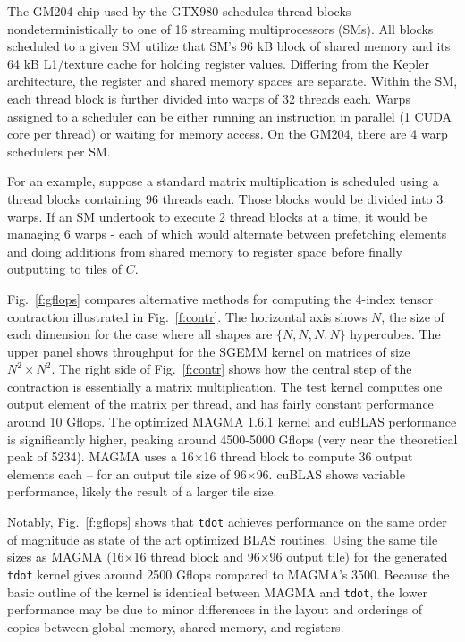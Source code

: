 \documentclass{sigplanconf}
\begin{document}
  The GM204 chip used by the GTX980 schedules thread blocks nondeterministically
to one of 16 streaming multiprocessors (SMs).  All blocks scheduled to a given SM
utilize that SM's 96 kB block of shared memory and its
64 kB L1/texture cache for holding register values. 
Differing from the Kepler architecture, the register and shared memory spaces are separate.
 Within the SM, each thread
block is further divided into warps of 32 threads each.
Warps assigned to a scheduler can be either running an instruction in parallel
(1 CUDA core per thread) or waiting for memory access.
On the GM204, there are 4 warp schedulers per SM.

  For an example, suppose a standard matrix multiplication is scheduled
using a thread blocks containing 96 threads each.  Those blocks would be
divided into 3 warps.  If an SM undertook to execute 2 thread blocks at a time,
it would be managing 6 warps - each of which would alternate between prefetching
elements and doing additions from shared memory to register space
before finally outputting to tiles of $C$.

  Fig.~\ref{f:gflops} compares alternative methods for computing the 4-index
tensor contraction illustrated in Fig.~\ref{f:contr}.  The horizontal
axis shows $N$, the size of each dimension for the case where all shapes are
$\{N,N,N,N\}$ hypercubes.
The upper panel shows throughput for the SGEMM kernel on matrices of size $N^2 \times N^2$.
The right side of Fig.~\ref{f:contr} shows how the central step
of the contraction is essentially a matrix multiplication.  The test kernel
computes one output element of the matrix per thread, and has fairly
constant performance around 10 Gflops.
The optimized MAGMA 1.6.1 kernel and cuBLAS performance is significantly
higher, peaking around 4500-5000 Gflops (very near the theoretical peak of
5234).  MAGMA uses a 16$\times$16 thread
block to compute 36 output elements each -- for an output tile size of 96$\times$96.
cuBLAS shows variable performance, likely the result of a larger tile size.

  Notably, Fig.~\ref{f:gflops} shows that {\tt tdot} achieves performance on the same order
of magnitude as state of the art optimized BLAS routines.
Using the same tile sizes as MAGMA (16$\times$16 thread block and 96$\times$96 output tile)
for the generated {\tt tdot} kernel gives around 2500 Gflops compared to MAGMA's 3500.
Because the basic outline of the kernel is identical between MAGMA and
{\tt tdot}, the lower performance may be due to
minor differences in the layout and orderings of copies between global memory,
shared memory, and registers.
\end{document}
